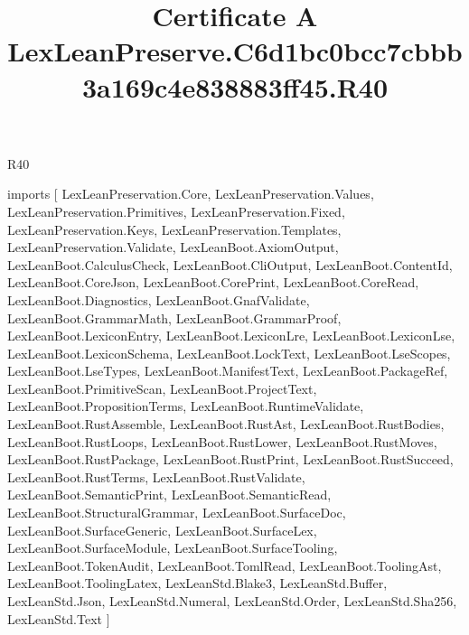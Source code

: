 \begin{lexlean}{R40}
\title{Certificate A LexLeanPreserve.C6d1bc0bcc7cbbb3a169c4e838883ff45.R40}
\begin{coremodule}
imports [
  LexLeanPreservation.Core,
  LexLeanPreservation.Values,
  LexLeanPreservation.Primitives,
  LexLeanPreservation.Fixed,
  LexLeanPreservation.Keys,
  LexLeanPreservation.Templates,
  LexLeanPreservation.Validate,
  LexLeanBoot.AxiomOutput,
  LexLeanBoot.CalculusCheck,
  LexLeanBoot.CliOutput,
  LexLeanBoot.ContentId,
  LexLeanBoot.CoreJson,
  LexLeanBoot.CorePrint,
  LexLeanBoot.CoreRead,
  LexLeanBoot.Diagnostics,
  LexLeanBoot.GnafValidate,
  LexLeanBoot.GrammarMath,
  LexLeanBoot.GrammarProof,
  LexLeanBoot.LexiconEntry,
  LexLeanBoot.LexiconLre,
  LexLeanBoot.LexiconLse,
  LexLeanBoot.LexiconSchema,
  LexLeanBoot.LockText,
  LexLeanBoot.LseScopes,
  LexLeanBoot.LseTypes,
  LexLeanBoot.ManifestText,
  LexLeanBoot.PackageRef,
  LexLeanBoot.PrimitiveScan,
  LexLeanBoot.ProjectText,
  LexLeanBoot.PropositionTerms,
  LexLeanBoot.RuntimeValidate,
  LexLeanBoot.RustAssemble,
  LexLeanBoot.RustAst,
  LexLeanBoot.RustBodies,
  LexLeanBoot.RustLoops,
  LexLeanBoot.RustLower,
  LexLeanBoot.RustMoves,
  LexLeanBoot.RustPackage,
  LexLeanBoot.RustPrint,
  LexLeanBoot.RustSucceed,
  LexLeanBoot.RustTerms,
  LexLeanBoot.RustValidate,
  LexLeanBoot.SemanticPrint,
  LexLeanBoot.SemanticRead,
  LexLeanBoot.StructuralGrammar,
  LexLeanBoot.SurfaceDoc,
  LexLeanBoot.SurfaceGeneric,
  LexLeanBoot.SurfaceLex,
  LexLeanBoot.SurfaceModule,
  LexLeanBoot.SurfaceTooling,
  LexLeanBoot.TokenAudit,
  LexLeanBoot.TomlRead,
  LexLeanBoot.ToolingAst,
  LexLeanBoot.ToolingLatex,
  LexLeanStd.Blake3,
  LexLeanStd.Buffer,
  LexLeanStd.Json,
  LexLeanStd.Numeral,
  LexLeanStd.Order,
  LexLeanStd.Sha256,
  LexLeanStd.Text
]


\end{coremodule}
\end{lexlean}
